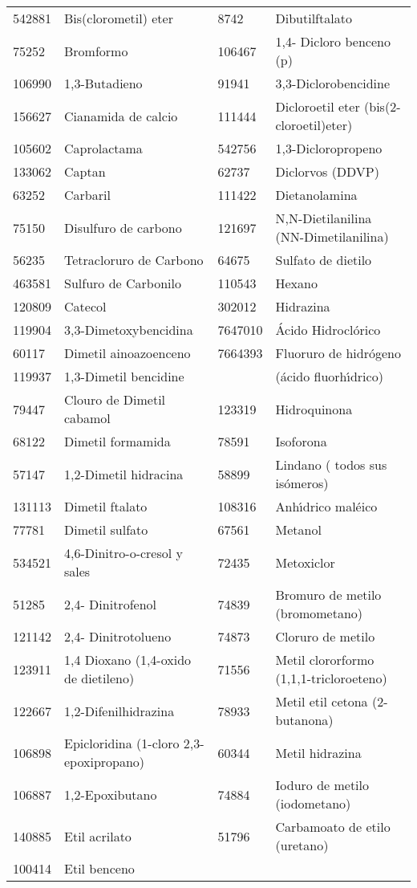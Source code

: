 \begin{table}[!htdp]
\begin{scriptsize}
\begin{supertabular}{| p{0.10\textwidth}p{0.35\textwidth}p{0.10\textwidth}p{0.35\textwidth} |}
542881& Bis(clorometil) eter &8742&Dibutilftalato\\
75252 & Bromformo &106467&1,4- Dicloro benceno (p) \\
106990 &1,3-Butadieno &91941& 3,3-Diclorobencidine \\
156627 & Cianamida de calcio &111444&Dicloroetil eter (bis(2-cloroetil)eter)\\
105602& Caprolactama& 542756 &1,3-Dicloropropeno\\ 
133062 & Captan & 62737 & Diclorvos (DDVP)\\
63252 & Carbaril &111422& Dietanolamina\\
75150 & Disulfuro de carbono & 121697 & N,N-Dietilanilina (NN-Dimetilanilina) \\
56235 & Tetracloruro de Carbono &64675&Sulfato de dietilo\\
463581 & Sulfuro de Carbonilo  &110543&Hexano\\
120809 & Catecol & 302012&Hidrazina \\
119904 & 3,3-Dimetoxybencidina &7647010&  \'Acido Hidrocl\'orico\\
60117 & Dimetil ainoazoenceno&7664393& Fluoruro de hidr\'ogeno\\
119937 & 1,3-Dimetil bencidine & &(\'acido fluorh\'{\i}drico)\\
79447 & Clouro de Dimetil cabamol&123319&Hidroquinona\\
  68122 & Dimetil formamida &78591&Isoforona\\
  57147 & 1,2-Dimetil hidracina & 58899&Lindano ( todos sus is\'omeros) \\
  131113&  Dimetil ftalato &108316&Anh\'{\i}drico mal\'eico \\
  77781 &Dimetil sulfato &67561&Metanol \\
  534521& 4,6-Dinitro-o-cresol y sales & 72435&Metoxiclor \\
  51285 & 2,4- Dinitrofenol & 74839 & Bromuro de metilo (bromometano)\\
  121142 & 2,4- Dinitrotolueno & 74873& Cloruro de metilo \\
  123911 & 1,4 Dioxano (1,4-oxido de dietileno) &71556&Metil clororformo (1,1,1-tricloroeteno)\\
  122667 & 1,2-Difenilhidrazina &78933&Metil etil cetona (2-butanona) \\
  106898 & Epicloridina (1-cloro 2,3-epoxipropano)&60344 &Metil hidrazina\\
  106887 & 1,2-Epoxibutano &74884&Ioduro de metilo (iodometano)\\
  140885 & Etil acrilato &51796 &Carbamoato de etilo (uretano) \\
  100414 & Etil benceno &  &\\\hline
\end{supertabular}
\end{scriptsize}
\label{airtox}
\end{table}%


